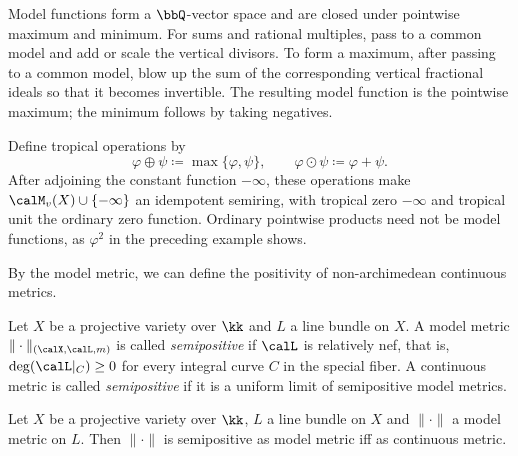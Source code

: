 \begin{remark}[label=\labelNFM{rmk:tropical-semiring-and-model-function}, status=draft, tag=0000000]
	\begin{latexmathchange}
		Model functions form a $\bbQ$-vector space and are closed under pointwise maximum and minimum.
		For sums and rational multiples, pass to a common model and add or scale the vertical divisors.
		To form a maximum, after passing to a common model, blow up the sum of the corresponding vertical fractional ideals so that it becomes invertible.
		The resulting model function is the pointwise maximum; the minimum follows by taking negatives.

		Define tropical operations by
		\[ \varphi \oplus \psi \coloneqq \max\{\varphi,\psi\}, \qquad \varphi \odot \psi \coloneqq \varphi + \psi. \]
		After adjoining the constant function $-\infty$, these operations make $\calM_v(X) \cup \{-\infty\}$ an idempotent semiring,
		with tropical zero $-\infty$ and tropical unit the ordinary zero function.
		Ordinary pointwise products need not be model functions, as $\varphi^2$ in the preceding example shows.
	\end{latexmathchange}
\end{remark}


By the model metric, we can define the positivity of non-archimedean continuous metrics.

\begin{definition}[label=\labelNFM{def:semipositive-local-metric}, status=draft, tag=0000000]
	Let $X$ be a projective variety over $\kk$ and $L$ a line bundle on $X$.
	A model metric $\|\cdot\|_{(\calX,\calL,m)}$ is called \emph{semipositive} if $\calL$ is relatively nef, that is, $\deg(\calL|_C) \geq 0$ for every integral curve $C$ in the special fiber.
	A continuous metric is called \emph{semipositive} if it is a uniform limit of semipositive model metrics.
\end{definition}

\begin{lemma}[label=\labelNFM{lem:semipositive-is-well-defined}, status=draft, tag=0000000]
	Let $X$ be a projective variety over $\kk$, $L$ a line bundle on $X$ and $\|\cdot\|$ a model metric on $L$.
	Then $\|\cdot\|$ is semipositive as model metric iff as continuous metric.
	\Yang{}
\end{lemma}


